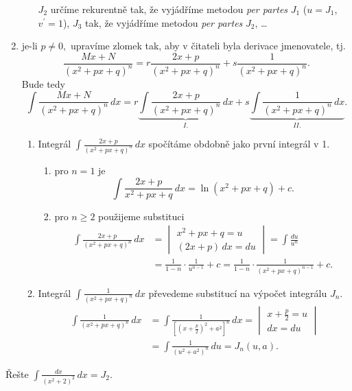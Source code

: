 \begin{pozn}
\begin{enumerate}[1.]
\begin{enumerate}[$I.$]
$$    $$
    $J_2$ určíme rekurentně tak, že vyjádříme metodou \textit{per partes} $J_1$ ($u=J_1$, $v^\prime =1$),
    $J_3$ tak, že vyjádříme metodou \textit{per partes} $J_2$, \dots
    \end{enumerate}
   	\item je-li $p\ne 0,$ upravíme zlomek tak, aby v čitateli byla derivace jmenovatele, tj.
    $$\frac{Mx+N}{(x^2+px+q)^n}=r\frac{2x+p}{(x^2+px+q)^n}+s \frac{1}{(x^2+px+q)^n}.$$
    Bude tedy
    $$\int \frac{Mx+N}{(x^2+px+q)^n}\, dx =r\underbrace{\int \frac{2x+p}{(x^2+px+q)^n}\, dx}_{I.}+s \underbrace{\int \frac{1}{(x^2+px+q)^n}\, dx}_{II.}.$$
    \begin{enumerate}[$I.$]
    \item Integrál $\int \frac{2x+p}{(x^2+px+q)^n}\, dx$ spočítáme obdobně jako první integrál v 1.
    \begin{enumerate}[$i.$]
    \item pro $n=1$ je
    $$\int \frac{2x+p}{x^2+px+q}\, dx = \ln(x^2+px+q)+c.$$
   	\item pro $n \geq 2$ použijeme substituci
    \begin{align*}
    \int \frac{2x+p}{(x^2+px+q)^n}\, dx &= \begin{vmatrix}
x^2+px+q=u \\
(2x+p)\, dx = du
\end{vmatrix}=\int \frac{du}{u^n}\\
& = \frac{1}{1-n}\cdot \frac{1}{u^{n-1}}+c = \frac{1}{1-n}\cdot \frac{1}{(x^2+px+q)^{n-1}}+c.
    \end{align*}
    \end{enumerate}
   	\item Integrál $\int \frac{1}{(x^2+px+q)^n}\, dx$ převedeme substitucí na výpočet
    integrálu $J_n$.
    \begin{align*}
        \int \frac{1}{(x^2+px+q)^n}\, dx &= \int \frac{1}{\left [ \left ( x+\frac{p}{2} \right )^2 +a^2 \right ]^n }\, dx = \begin{vmatrix}
            x+\frac{p}{2}=u \\
            dx = du
        \end{vmatrix} \\
        &= \int \frac{1}{(u^2+a^2)^n}\, du  = J_n(u,a).
    \end{align*}
    \end{enumerate}
\end{enumerate}
\end{pozn}

\begin{priklad}
Řešte $\int \frac{dx}{(x^2+2)^2}\, dx = J_2.$
\end{priklad}

